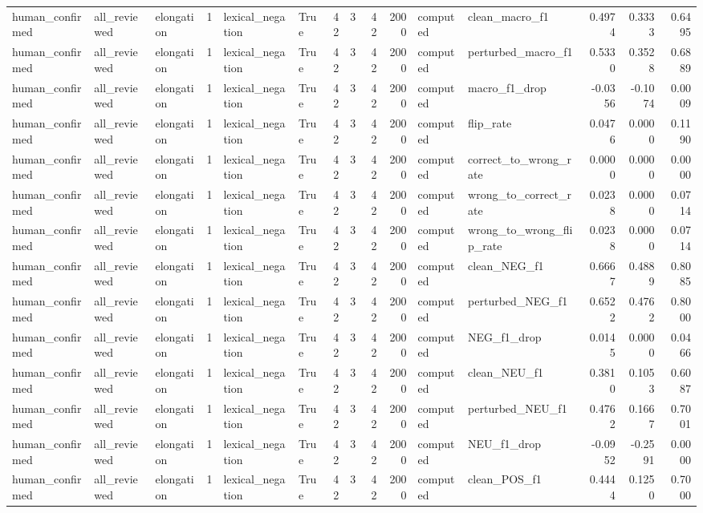 \begin{tabular}{lllrllrrrrllrrr}
human_confirmed & all_reviewed & elongation & 1 & lexical_negation & True & 42 & 3 & 42 & 2000 & computed & clean_macro_f1 & 0.4974 & 0.3333 & 0.6495 \\
human_confirmed & all_reviewed & elongation & 1 & lexical_negation & True & 42 & 3 & 42 & 2000 & computed & perturbed_macro_f1 & 0.5330 & 0.3528 & 0.6889 \\
human_confirmed & all_reviewed & elongation & 1 & lexical_negation & True & 42 & 3 & 42 & 2000 & computed & macro_f1_drop & -0.0356 & -0.1074 & 0.0009 \\
human_confirmed & all_reviewed & elongation & 1 & lexical_negation & True & 42 & 3 & 42 & 2000 & computed & flip_rate & 0.0476 & 0.0000 & 0.1190 \\
human_confirmed & all_reviewed & elongation & 1 & lexical_negation & True & 42 & 3 & 42 & 2000 & computed & correct_to_wrong_rate & 0.0000 & 0.0000 & 0.0000 \\
human_confirmed & all_reviewed & elongation & 1 & lexical_negation & True & 42 & 3 & 42 & 2000 & computed & wrong_to_correct_rate & 0.0238 & 0.0000 & 0.0714 \\
human_confirmed & all_reviewed & elongation & 1 & lexical_negation & True & 42 & 3 & 42 & 2000 & computed & wrong_to_wrong_flip_rate & 0.0238 & 0.0000 & 0.0714 \\
human_confirmed & all_reviewed & elongation & 1 & lexical_negation & True & 42 & 3 & 42 & 2000 & computed & clean_NEG_f1 & 0.6667 & 0.4889 & 0.8085 \\
human_confirmed & all_reviewed & elongation & 1 & lexical_negation & True & 42 & 3 & 42 & 2000 & computed & perturbed_NEG_f1 & 0.6522 & 0.4762 & 0.8000 \\
human_confirmed & all_reviewed & elongation & 1 & lexical_negation & True & 42 & 3 & 42 & 2000 & computed & NEG_f1_drop & 0.0145 & 0.0000 & 0.0466 \\
human_confirmed & all_reviewed & elongation & 1 & lexical_negation & True & 42 & 3 & 42 & 2000 & computed & clean_NEU_f1 & 0.3810 & 0.1053 & 0.6087 \\
human_confirmed & all_reviewed & elongation & 1 & lexical_negation & True & 42 & 3 & 42 & 2000 & computed & perturbed_NEU_f1 & 0.4762 & 0.1667 & 0.7001 \\
human_confirmed & all_reviewed & elongation & 1 & lexical_negation & True & 42 & 3 & 42 & 2000 & computed & NEU_f1_drop & -0.0952 & -0.2591 & 0.0000 \\
human_confirmed & all_reviewed & elongation & 1 & lexical_negation & True & 42 & 3 & 42 & 2000 & computed & clean_POS_f1 & 0.4444 & 0.1250 & 0.7000 \\

\end{tabular}
